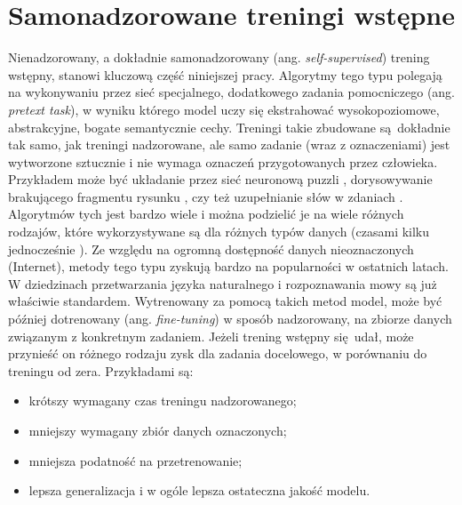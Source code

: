 \section{Samonadzorowane treningi wstępne}

Nienadzorowany, a dokładnie samonadzorowany (ang. \emph{self-supervised}) trening wstępny, stanowi kluczową część niniejszej pracy. Algorytmy tego typu polegają na wykonywaniu przez sieć specjalnego, dodatkowego zadania pomocniczego (ang. \emph{pretext task}), w wyniku którego model uczy się ekstrahować wysokopoziomowe, abstrakcyjne, bogate semantycznie cechy. Treningi takie zbudowane są dokładnie tak samo, jak treningi nadzorowane, ale samo zadanie (wraz z oznaczeniami) jest wytworzone sztucznie i nie wymaga oznaczeń przygotowanych przez człowieka. Przykładem może być układanie przez sieć neuronową puzzli \cite{noroozi_unsupervised_2017}, dorysowywanie brakującego fragmentu rysunku \cite{pathak_context_2016}, czy też uzupełnianie słów w zdaniach \cite{devlin_bert_2019}. Algorytmów tych jest bardzo wiele i można podzielić je na wiele różnych rodzajów, które wykorzystywane są dla różnych typów danych (czasami kilku jednocześnie \cite{jia_scaling_2021}). Ze względu na ogromną dostępność danych nieoznaczonych (Internet), metody tego typu zyskują bardzo na popularności w ostatnich latach. W dziedzinach przetwarzania języka naturalnego i rozpoznawania mowy są już właściwie standardem. Wytrenowany za pomocą takich metod model, może być później dotrenowany (ang. \emph{fine-tuning}) w sposób nadzorowany, na zbiorze danych związanym z konkretnym zadaniem. Jeżeli trening wstępny się udał, może przynieść on różnego rodzaju zysk dla zadania docelowego, w porównaniu do treningu od zera. Przykładami są:
\begin{itemize}
    \item krótszy wymagany czas treningu nadzorowanego;
    \item mniejszy wymagany zbiór danych oznaczonych;
    \item mniejsza podatność na przetrenowanie;
    \item lepsza generalizacja i w ogóle lepsza ostateczna jakość modelu.
\end{itemize}

